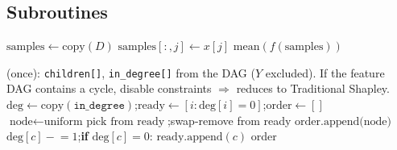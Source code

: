 \documentclass[12pt,letterpaper,twocolumn]{article}
\begin{document}
\subsection{Subroutines}

\begin{algorithm}[H]
  \caption{COALITION\_VALUE --- $v(S) = \mathbb{E}[f(X) \mid X_S = x_S]$}
  \label{alg:coalition_value}
  \begin{algorithmic}[1]
      \State $\text{samples} \gets \text{copy}(D)$
        \State $\text{samples}[:,j] \gets x[j]$
      \EndFor
      \Return $\text{mean}(f(\text{samples}))$
    \EndFunction
  \end{algorithmic}
\end{algorithm}

\begin{algorithm}[H]
  \caption{SAMPLE\_TOPOLOGICAL\_ORDERING --- uniform random linear extension (Kahn)}
  \label{alg:topo}
  \begin{algorithmic}[1]
    \PRECOMPUTE (once): \texttt{children[]}, \texttt{in\_degree[]} from the DAG ($Y$ excluded).
    \Statex \hspace{2.5em} If the feature DAG contains a cycle, disable constraints $\Rightarrow$ reduces to Traditional Shapley.
      \State $\text{deg} \gets \text{copy}(\texttt{in\_degree})$;\quad $\text{ready} \gets [i : \text{deg}[i] = 0]$;\quad $\text{order} \gets []$
        \State $\text{node} \gets \text{uniform pick from ready}$;\quad swap-remove from ready
        \State $\text{order.append(node)}$
          \State $\text{deg}[c] \mathrel{-}= 1$;\quad \textbf{if} $\text{deg}[c] = 0$: $\text{ready.append}(c)$
        \EndFor
      \EndWhile
      \Return order
    \EndFunction
  \end{algorithmic}
\end{algorithm}
\end{document}
